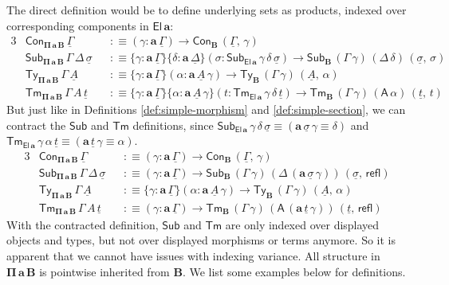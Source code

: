 \documentclass[12pt,a4paper,twoside,openany]{book}
\theoremstyle{remark}
\theoremstyle{definition}
\theoremstyle{theorem}
\newcommand{\bs}[1]{\boldsymbol{#1}}
\newcommand{\refl}{\mathsf{refl}}
\newcommand{\Con}{\mathsf{Con}}
\newcommand{\Sub}{\mathsf{Sub}}
\newcommand{\Tm}{\mathsf{Tm}}
\newcommand{\Ty}{\mathsf{Ty}}
\newcommand{\El}{\mathsf{El}}
\newcommand{\A}{\mathsf{A}}
\newcommand{\ba}{\bs{a}}
\newcommand{\bB}{\bs{B}}
\newcommand{\ul}[1]{\underline{#1}}
\newcommand{\ulGamma}{\ul{\Gamma}}
\newcommand{\ulDelta}{\ul{\Delta}}
\newcommand{\ulsigma}{\ul{\sigma}}
\newcommand{\ult}{\ul{t}}
\newcommand{\ulA}{\ul{A}}
\newcommand{\defn}{:\equiv}
\begin{document}
The direct definition would be to define underlying sets as products, indexed
over corresponding components in $\bs{\El\,a}$:
\begin{alignat*}{3}
  & \Con_{\bs{\Pi\,a\,B}}\,\ulGamma &&\defn (\gamma : \ba\,\ulGamma) \to \Con_{\bB}\,(\ulGamma,\,\gamma)\\
  & \Sub_{\bs{\Pi\,a\,B}}\,\Gamma\,\Delta\,\ulsigma &&\defn
    \{\gamma : \ba\,\ulGamma\}\{\delta : \ba\,\ulDelta\}(\sigma : \Sub_{\bs{\El\,a}}\,\gamma\,\delta\,\ulsigma) \to \Sub_{\bB}\,(\Gamma\,\gamma)\,(\Delta\,\delta)\,(\ulsigma,\,\sigma)\\
  & \Ty_{\bs{\Pi\,a\,B}}\,\Gamma\,\ulA &&\defn
    \{\gamma : \ba\,\ulGamma\}(\alpha : \ba\,\ulA\,\gamma) \to \Ty_{\bB}\,(\Gamma\,\gamma)\,(\ulA,\,\alpha)\\
  & \Tm_{\bs{\Pi\,a\,B}}\,\Gamma\,A\,\ult &&\defn
    \{\gamma : \ba\,\ulGamma\}\{\alpha : \ba\,\ulA\,\gamma\}(t : \Tm_{\bs{\El\,a}}\,\gamma\,\delta\,\ult)
      \to
    \Tm_{\bB}\,(\Gamma\,\gamma)\,(\A\,\alpha)\,(\ult,\,t)
\end{alignat*}
But just like in Definitions \ref{def:simple-morphism} and
\ref{def:simple-section}, we can contract the $\Sub$ and $\Tm$ definitions,
since $\Sub_{\bs{\El\,a}}\,\gamma\,\delta\,\ulsigma \equiv
(\ba\,\ulsigma\,\gamma \equiv \delta)$ and
$\Tm_{\bs{\El\,a}}\,\gamma\,\alpha\,\ult \equiv (\ba\,\ult\,\gamma \equiv
\alpha)$.
\begin{alignat*}{3}
  & \Con_{\bs{\Pi\,a\,B}}\,\ulGamma &&\defn (\gamma : \ba\,\ulGamma) \to \Con_{\bB}\,(\ulGamma,\,\gamma)\\
  & \Sub_{\bs{\Pi\,a\,B}}\,\Gamma\,\Delta\,\ulsigma &&\defn
    (\gamma : \ba\,\ulGamma)\to \Sub_{\bB}\,(\Gamma\,\gamma)\,(\Delta\,(\ba\,\ulsigma\,\gamma))\,(\ulsigma,\,\refl)\\
  & \Ty_{\bs{\Pi\,a\,B}}\,\Gamma\,\ulA &&\defn
  \{\gamma : \ba\,\ulGamma\}(\alpha : \ba\,\ulA\,\gamma)
  \to \Ty_{\bB}\,(\Gamma\,\gamma)\,(\ulA,\,\alpha)\\
  & \Tm_{\bs{\Pi\,a\,B}}\,\Gamma\,A\,\ult &&\defn
    (\gamma : \ba\,\ulGamma) \to \Tm_{\bB}\,(\Gamma\,\gamma)\,(\A\,(\ba\,\ult\,\gamma))\,(\ult,\,\refl)
\end{alignat*}
With the contracted definition, $\Sub$ and $\Tm$ are only indexed over displayed
objects and types, but not over displayed morphisms or terms anymore. So it is
apparent that we cannot have issues with indexing variance. All structure in
$\bs{\Pi\,a\,B}$ is pointwise inherited from $\bB$. We list some examples below
for definitions.
\begingroup
\allowdisplaybreaks
\end{document}
